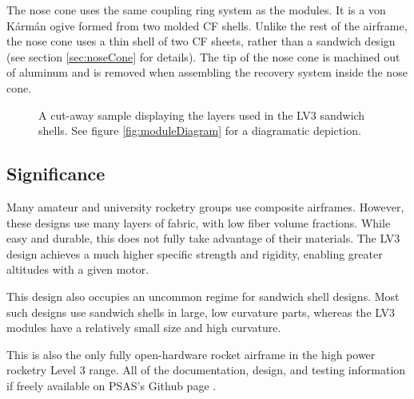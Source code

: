 \documentclass{aiaa-tc}%
\begin{document}
The nose cone uses the same coupling ring system as the modules. It is a von K\'arm\'an ogive formed from two molded CF shells. 
Unlike the rest of the airframe, the nose cone uses a thin shell of two CF sheets, rather than a sandwich design (see section \ref{sec:noseCone} for details). 
The tip of the nose cone is machined out of aluminum and is removed when assembling the recovery system inside the nose cone. 

\begin{figure}
\centering
\def\svgwidth{\linewidth}
\parbox{0.45\linewidth}{
	
	\caption{
		Diagram of the male end of a module. 
		The CF (1) is bonded to the honeycomb core (3) and the aluminum coupling ring (4) using structural adhesive (2). 
		The adhesive also serves as a protective coating for the CF and provides a smooth outer surface. 
		See figure \ref{fig:coupon} for a picture of this design.
		}
	\label{fig:moduleDiagram}
}
\hfill
\parbox{0.45\linewidth}{
	
	\caption{
		A cut-away sample displaying the layers used in the LV3 sandwich shells. 
		See figure \ref{fig:moduleDiagram} for a diagramatic depiction.
		}
	\label{fig:coupon}
}
\end{figure}

\subsection{Significance}
Many amateur and university rocketry groups use composite airframes. However, these designs use many layers of fabric, with low fiber volume fractions.
While easy and durable, this does not fully take advantage of their materials. The LV3 design achieves a much higher specific strength and rigidity, enabling greater altitudes with a given motor. 

This design also occupies an uncommon regime for sandwich shell designs. Most such designs use sandwich shells in large, low curvature parts, whereas the LV3 modules have a relatively small size and high curvature.

This is also the only fully open-hardware rocket airframe in the high power rocketry Level 3 range. All of the documentation, design, and testing information if freely available on PSAS's Github page \cite{LV3repo}.
\end{document}
